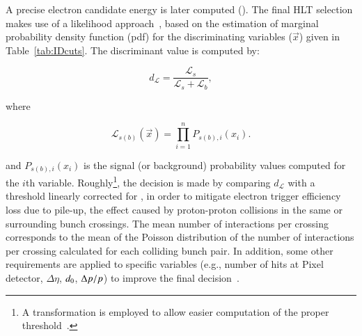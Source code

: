   
  


A precise electron candidate energy is later computed (\hltcalo). The final HLT selection makes use of a likelihood
approach~\cite{ATL-COM-PHYS-2017-1012,ATLAS-PERF-2017-01-002}, based on the estimation of marginal probability density function (pdf) for the discriminating variables ($\vec{x}$) given in Table~\ref{tab:IDcuts}. The discriminant value is computed by:




\begin{equation}
  d_{\mathcal{L}} = \frac{\mathcal{L}_{s}}{\mathcal{L}_{s} + \mathcal{L}_{b}},
\end{equation}
  
\noindent where
  
\begin{equation}
\mathcal{L}_{s(b)}(\vec{x}) = \prod_{i=1}^{n} P_{s(b),i}(x_i).
\label{eq:likelihoods}
\end{equation}



\noindent and $P_{s(b),i}(x_i)$ is the signal (or background) probability values computed for the $i$th variable. Roughly\footnote{A transformation is employed to allow
easier computation of the proper threshold~\cite{aaboud2019electron}.},
the decision is made by comparing $d_{\mathcal{L}}$ with a
threshold linearly corrected for \avgmu{}, in order to mitigate electron trigger
efficiency loss due to pile-up, the effect caused by proton-proton collisions in the same or surrounding bunch crossings. The mean number of interactions per crossing \avgmu{} corresponds to the
mean of the Poisson distribution of the number of interactions per crossing calculated for each colliding bunch pair. In addition, some other requirements are
applied to specific variables (e.g., number of hits at Pixel detector, $\Delta\eta$, $d_0$, $\Delta p/p$) to improve the final decision~\cite{aaboud2019electron}.

